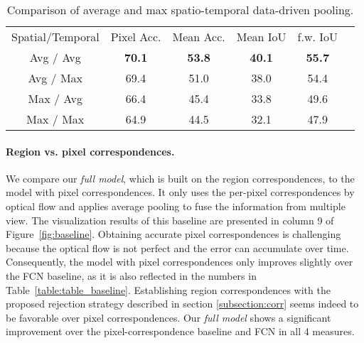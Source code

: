 \begin{table}[t!]
\scriptsize
  \begin{center}
    \caption{Comparison of average and max spatio-temporal data-driven pooling.}
    \label{table:table_avg_max}
    \begin{tabular}{cccccc}
      \toprule
      Spatial/Temporal & Pixel Acc.  & Mean Acc. & Mean IoU & f.w. IoU \\
      \cmidrule(lr){1-1}\cmidrule(lr){2-5}
      {\sc Avg} / {\sc Avg} & \textbf{70.1} & \textbf{53.8} & \textbf{40.1} & \textbf{55.7}  \\
      {\sc Avg} / {\sc Max}  & 69.4 & 51.0 & 38.0  & 54.4 \\
      {\sc Max} / {\sc Avg} & 66.4 & 45.4 & 33.8 & 49.6 \\
      {\sc Max} / {\sc Max} & 64.9 & 44.5 & 32.1 & 47.9 \\
      \bottomrule
    \end{tabular}
  \end{center}
\end{table}

\vspace{-0.2cm}
\paragraph{Region vs. pixel correspondences.}
We compare our \textit{full model}, which is built on the region correspondences, to the model with pixel correspondences. It only uses the per-pixel correspondences by optical flow and applies average pooling to fuse the information from multiple view. The visualization results of this baseline are presented in column 9 of Figure~\ref{fig:baseline}. 
Obtaining accurate pixel correspondences is challenging because the optical flow is not perfect and the error can accumulate over time.
Consequently, the model with pixel correspondences only improves slightly over the FCN baseline, as it is also reflected in the numbers in Table~\ref{table:table_baseline}.
Establishing region correspondences with the proposed rejection strategy described in section \ref{subsection:corr} seems indeed to be favorable over pixel correspondences.
Our \textit{full model} shows a significant improvement over the pixel-correspondence baseline and FCN in all 4 measures. 


\vspace{-0.3cm}

